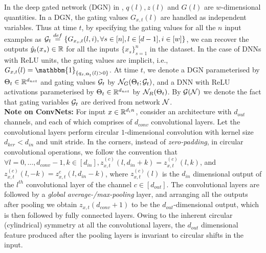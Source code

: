 In the deep gated network (DGN) in , $q(l),z(l)$ and $G(l)$ are $w$-dimensional quantities. In a DGN, the gating values $G_{x,t}(l)$ are handled as independent variables. Thus at time $t$, by specifying the gating values for all the $n$ input examples as $\mathcal{G}_t\stackrel{def}=\{G_{x_{s},t}(l,i), \forall s\in[n],l\in[d-1],i\in[w]\}$, we can recover the outputs $\hat{y}_t(x_s)\in \mathbb{R}$ for all the inputs $\{x_s\}_{s=1}^n$ in the dataset. In the case of DNNs with ReLU units, the gating values are implicit, i.e., $G_{x,t}(l)=\mathbbm{1}_{\{q_{x,\Theta_t}(l)>0\}}$. At time $t$, we denote a DGN parameterised by $\Theta_t\in \mathbb{R}^{d_{net}}$ and gating values $\mathcal{G}_t$ by $\mathcal{N}_G(\Theta_t;\mathcal{G}_t)$, and a DNN with ReLU activations parameterised by $\Theta_t\in\mathbb{R}^{d_{net}}$ by $\mathcal{N}_R(\Theta_t)$. By $\mathcal{G}(\mathcal{N})$ we denote the fact that gating variables  $\mathcal{G}_t$ are derived from network $\mathcal{N}$.\hfill\\
\textbf{Note on ConvNets:} For input $x\in\mathbb{R}^{d_in}$, consider an architecture with $d_{out}$ channels, and each of which comprises of $d_{conv}$ convolutional layers. Let the convolutional layers perform circular $1$-dimensional convolution with kernel size $d_{ker}<d_{in}$ and unit stride. In the corners, instead of \emph{zero-padding}, in circular convolutional operations, we follow the convention that $\forall l=0,\ldots, d_{conv}-1, k\in[d_{in}], z^{(c)}_{x,t}(l,d_{in}+k)=z^{(c)}_{x,t}(l,k)$, and $z^{(c)}_{x,t}(l,-k)=z^{c}_{x,t}(l,d_{in}-k)$, where $z^{(c)}_{x,t}(l)$ is the $d_{in}$ dimensional output of the $l^{th}$ convolutional layer of the channel $c\in[d_{out}]$. The convolutional layers are followed by a \emph{global average-/max-pooling} layer, and arranging all the outputs after pooling we obtain $z_{x,t}(d_{conv}+1)$ to be the $d_{out}$-dimensional output, which is then followed by fully connected layers. Owing to the inherent circular (cylindrical) symmetry at all the convolutional layers, the $d_{out}$ dimensional feature produced after the pooling layers is invariant to circular shifts in the input.
